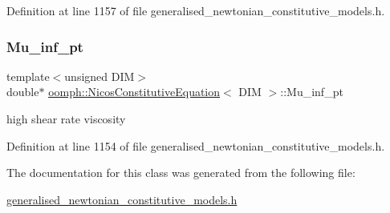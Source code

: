 Definition at line 1157 of file generalised\+\_\+newtonian\+\_\+constitutive\+\_\+models.\+h.

\mbox{\label{classoomph_1_1NicosConstitutiveEquation_ab74dee7f73e8b290c4ba251f72d17468}} 
\subsubsection{\texorpdfstring{Mu\+\_\+inf\+\_\+pt}{Mu\_inf\_pt}}
{\footnotesize\ttfamily template$<$unsigned D\+IM$>$ \\
double$\ast$ \hyperlink{classoomph_1_1NicosConstitutiveEquation}{oomph\+::\+Nicos\+Constitutive\+Equation}$<$ D\+IM $>$\+::Mu\+\_\+inf\+\_\+pt\hspace{0.3cm}{\ttfamily [private]}}



high shear rate viscosity 



Definition at line 1154 of file generalised\+\_\+newtonian\+\_\+constitutive\+\_\+models.\+h.



The documentation for this class was generated from the following file\+:\begin{DoxyCompactItemize}
\item 
\hyperlink{generalised__newtonian__constitutive__models_8h}{generalised\+\_\+newtonian\+\_\+constitutive\+\_\+models.\+h}\end{DoxyCompactItemize}
